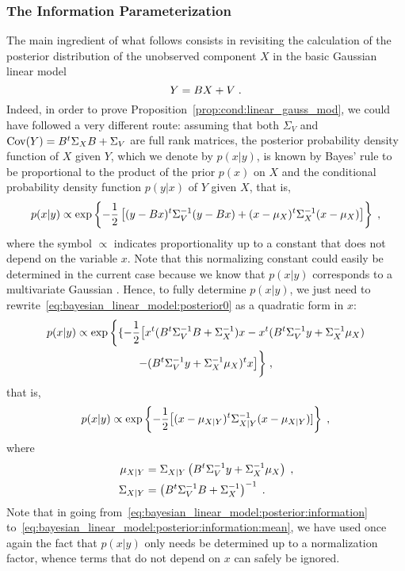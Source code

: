\subsubsection{The Information Parameterization}
The main ingredient of what follows consists in revisiting the calculation of
the posterior distribution of the unobserved component $X$ in the basic
Gaussian linear model
\[
  Y = B X + V \; .
\]
Indeed, in order to prove Proposition~\ref{prop:cond:linear_gauss_mod}, we
could have followed a very different route: assuming that both $\Sigma_V$ and
$\operatorname{Cov}(Y) = B^t \Sigma_X B + \Sigma_V$ are full rank matrices, the posterior
probability density function of $X$ given $Y$, which we denote by $p(x|y)$, is
known by Bayes' rule to be proportional to the product of the prior $p(x)$ on
$X$ and the conditional probability density function $p(y|x)$ of $Y$ given $X$, that is,
\begin{equation}
  \label{eq:bayesian_linear_model:posterior0}
  p(x|y) \propto \exp \left\{-\frac{1}{2} \left[(y-Bx)^t \Sigma_V^{-1} (y-Bx) + (x-\mu_X)^t\Sigma_X^{-1}(x-\mu_X)  \right] \right\} \; ,
\end{equation}
where the symbol $\propto$ indicates proportionality up to a constant that does not
depend on the variable $x$. Note that this normalizing constant
could easily be determined in the current case because we know that $p(x|y)$
corresponds to a multivariate Gaussian \pdf. Hence, to fully determine $p(x|y)$,
we just need to rewrite~\eqref{eq:bayesian_linear_model:posterior0} as a
quadratic form in $x$:
\begin{multline}
  \label{eq:bayesian_linear_model:posterior:information}
  p(x|y) \propto \exp \bigg\{ \{-\frac{1}{2}\bigl[x^t(B^t\Sigma_V^{-1}B+\Sigma_X^{-1})x - x^t(B^t\Sigma_V^{-1}y+\Sigma_X^{-1}\mu_X) \\
  - (B^t\Sigma_V^{-1}y+\Sigma_X^{-1}\mu_X)^t x\bigr] \bigg\} \; ,
\end{multline}
that is,
\begin{equation}
  \label{eq:bayesian_linear_model:posterior:information:interp}
  p(x|y) \propto \exp \left\{ -\frac{1}{2}\bigl[(x-\mu_{X|Y})^t \Sigma_{X|Y}^{-1} (x-\mu_{X|Y}) ] \right\} \; ,
\end{equation}
where
\begin{align}
  \label{eq:bayesian_linear_model:posterior:information:mean}
  \mu_{X|Y} & = \Sigma_{X|Y} \left(B^t\Sigma_V^{-1}y + \Sigma_X^{-1}\mu_X\right) \; , \\
  \label{eq:bayesian_linear_model:posterior:information:cov}
  \Sigma_{X|Y} & = \left(B^t\Sigma_V^{-1}B + \Sigma_X^{-1} \right)^{-1} \; .
\end{align}
Note that in going from~\eqref{eq:bayesian_linear_model:posterior:information}
to~\eqref{eq:bayesian_linear_model:posterior:information:mean}, we have used
once again the fact that $p(x|y)$ only needs be determined up to a
normalization factor, whence terms that do not depend on $x$ can
safely be ignored.

